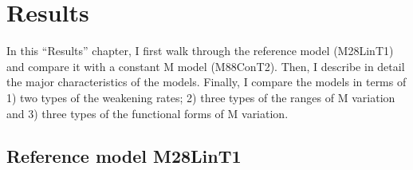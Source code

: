 \pagebreak
\section{Results}
In this ``Results'' chapter, I first walk through the reference model (M28LinT1) and compare it with a constant M model (M88ConT2). Then, I describe in detail the major characteristics of the models. Finally, I compare the models in terms of 1) two types of the weakening rates; 2) three types of the ranges of M variation and 3) three types of the functional forms of M variation.

\subsection{Reference model M28LinT1}\label{sec_M28LinT1}

